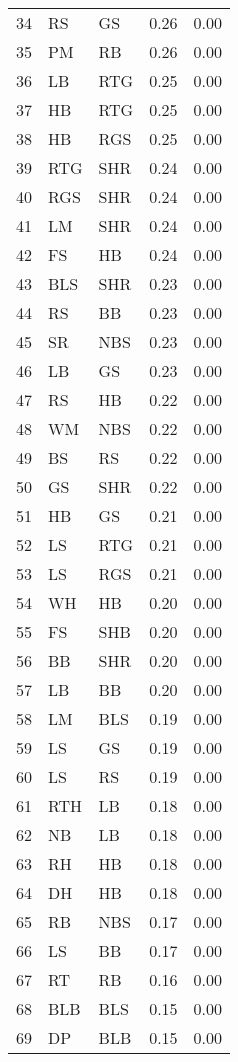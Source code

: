 \begin{table}[ht]
\begin{tabular}{rllrr}
  34 & RS & GS & 0.26 & 0.00 \\ 
  35 & PM & RB & 0.26 & 0.00 \\ 
  36 & LB & RTG & 0.25 & 0.00 \\ 
  37 & HB & RTG & 0.25 & 0.00 \\ 
  38 & HB & RGS & 0.25 & 0.00 \\ 
  39 & RTG & SHR & 0.24 & 0.00 \\ 
  40 & RGS & SHR & 0.24 & 0.00 \\ 
  41 & LM & SHR & 0.24 & 0.00 \\ 
  42 & FS & HB & 0.24 & 0.00 \\ 
  43 & BLS & SHR & 0.23 & 0.00 \\ 
  44 & RS & BB & 0.23 & 0.00 \\ 
  45 & SR & NBS & 0.23 & 0.00 \\ 
  46 & LB & GS & 0.23 & 0.00 \\ 
  47 & RS & HB & 0.22 & 0.00 \\ 
  48 & WM & NBS & 0.22 & 0.00 \\ 
  49 & BS & RS & 0.22 & 0.00 \\ 
  50 & GS & SHR & 0.22 & 0.00 \\ 
  51 & HB & GS & 0.21 & 0.00 \\ 
  52 & LS & RTG & 0.21 & 0.00 \\ 
  53 & LS & RGS & 0.21 & 0.00 \\ 
  54 & WH & HB & 0.20 & 0.00 \\ 
  55 & FS & SHB & 0.20 & 0.00 \\ 
  56 & BB & SHR & 0.20 & 0.00 \\ 
  57 & LB & BB & 0.20 & 0.00 \\ 
  58 & LM & BLS & 0.19 & 0.00 \\ 
  59 & LS & GS & 0.19 & 0.00 \\ 
  60 & LS & RS & 0.19 & 0.00 \\ 
  61 & RTH & LB & 0.18 & 0.00 \\ 
  62 & NB & LB & 0.18 & 0.00 \\ 
  63 & RH & HB & 0.18 & 0.00 \\ 
  64 & DH & HB & 0.18 & 0.00 \\ 
  65 & RB & NBS & 0.17 & 0.00 \\ 
  66 & LS & BB & 0.17 & 0.00 \\ 
  67 & RT & RB & 0.16 & 0.00 \\ 
  68 & BLB & BLS & 0.15 & 0.00 \\ 
  69 & DP & BLB & 0.15 & 0.00 \\ 

\end{tabular}
\end{table}
